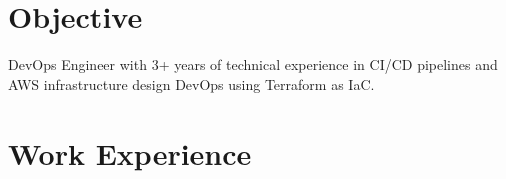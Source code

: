 \documentclass[a4paper, oneside, final]{scrartcl} %
\begin{document}
\begin{center} %


{\fontsize{36}{36}\selectfont\scshape{}} %

\vspace{1cm} %


\section{Objective}

DevOps Engineer with 3+ years of technical experience in CI/CD pipelines and AWS infrastructure design DevOps using Terraform as IaC.



\section{Work Experience}


\end{center}
\end{document}
